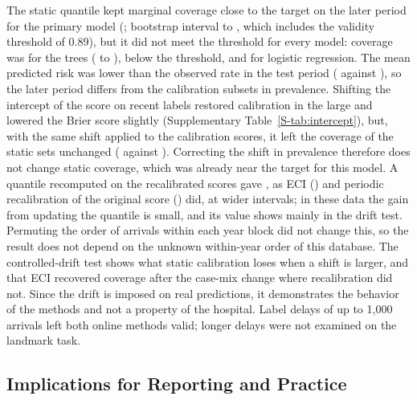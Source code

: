 The static quantile kept marginal coverage close to the target on the later period for the primary model (\RVIntCovStatic{}; bootstrap interval \RVStaticBootHybLo{} to \RVStaticBootHybHi{}, which includes the validity threshold of 0.89), but it did not meet the threshold for every model: coverage was \RVOtherXgbStaticCov{} for the trees (\RVStaticBootXgbLo{} to \RVStaticBootXgbHi{}), below the threshold, and \RVOtherLrStaticCov{} for logistic regression. The mean predicted risk was lower than
the observed rate in the test period (\RVCalMeanPredEndToEnd{} against \RVCalObserved{}), so the later period differs from the calibration subsets in prevalence. Shifting the intercept of the score on recent labels restored calibration in the large and lowered the Brier score slightly (Supplementary Table~\ref{S-tab:intercept}), but, with the same shift applied to the calibration scores, it left the coverage of the static sets unchanged (\RVIrCovOne{} against \RVIrCovOrig{}). Correcting the shift in prevalence therefore does not change static coverage, which was already near the target for this model. A quantile recomputed on the recalibrated scores gave \RVIrCovTwo{}, as ECI (\RVIntCovEci{}) and periodic recalibration of the original score (\RVIntCovRecalTen{}) did, at wider intervals; in these data the gain from updating the quantile is small, and its value shows mainly in the drift test. Permuting the order of arrivals within each year block did not change this, so the result does not depend on the unknown within-year order of this
database. The controlled-drift test shows what static calibration loses when a shift is larger, and that ECI recovered coverage after the case-mix change where
recalibration did not. Since the drift is imposed on real predictions, it demonstrates the behavior of the methods and not a property of the hospital. Label delays of up
to 1{,}000 arrivals left both online methods valid; longer delays were not examined on the landmark task.

\subsection{Implications for Reporting and Practice}

